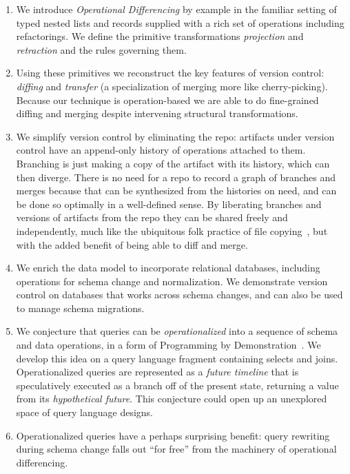 \documentclass[english,submission]{programming}
\theoremstyle{definition}
\begin{document}
\begin{enumerate}

\item We introduce \textit{Operational Differencing} by example in the familiar setting of typed nested lists and records supplied with a rich set of operations
including refactorings. We define the primitive transformations \textit{projection} and \textit{retraction} and the rules governing them.

\item Using these primitives we reconstruct the key features of version control: \textit{diffing} and \textit{transfer} (a specialization of merging more like cherry-picking). Because our technique is operation-based we are able to do fine-grained diffing and merging despite intervening structural transformations.

\item We simplify version control by eliminating the repo: artifacts under version control have an append-only history of operations attached to them. Branching is just making a copy of the artifact with its history, which can then diverge. There is no need for a repo to record a graph of branches and merges because that can be synthesized from the histories on need, and can be done so optimally in a well-defined sense. By liberating branches and versions of artifacts from the repo they can be shared freely and independently, much like the ubiquitous folk practice of file copying~\cite{Burnett14, Basman19}, but with the added benefit of being able to diff and merge.

\item We enrich the data model to incorporate relational databases, including operations for schema change and normalization. We demonstrate version control on databases that works across schema changes, and can also be used to manage schema migrations.

\item We conjecture that queries can be \textit{operationalized} into a sequence of schema and data operations, in a form of Programming by Demonstration~\cite{cypher93-pbd}. We develop this idea on a query language fragment containing selects and joins. Operationalized queries are represented as a \textit{future timeline} that is speculatively executed as a branch off of the present state, returning a value from its \textit{hypothetical future}. This conjecture could open up an unexplored space of query language designs.

\item Operationalized queries have a perhaps surprising benefit: query rewriting~\cite{curino08, herrmann17} during schema change falls out ``for free'' from the machinery of operational differencing.


\end{enumerate}
\end{document}
